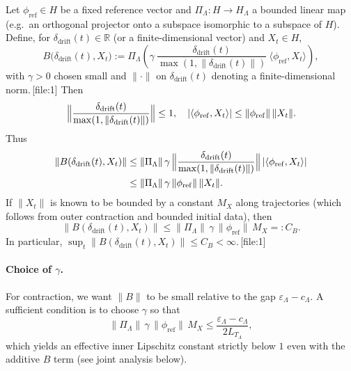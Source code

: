 \documentclass[11pt]{article}
\begin{document}
Let $\phi_{\mathrm{ref}}\in H$ be a fixed reference vector and $\Pi_\Lambda:H\to H_\Lambda$ a bounded linear map (e.g.\ an orthogonal projector onto a subspace isomorphic to a subspace of $H$). Define, for $\delta_{\mathrm{drift}}(t)\in\mathbb{R}$ (or a finite-dimensional vector) and $X_t\in H$,
\begin{equation}
B\bigl(\delta_{\mathrm{drift}}(t), X_t\bigr) 
:= \Pi_\Lambda\left(\gamma\ \frac{\delta_{\mathrm{drift}}(t)}{\max(1,\|\delta_{\mathrm{drift}}(t)\|)}\ \langle\phi_{\mathrm{ref}},X_t\rangle\right),
\label{eq:A-B-definition}
\end{equation}
with $\gamma>0$ chosen small and $\|\cdot\|$ on $\delta_{\mathrm{drift}}(t)$ denoting a finite-dimensional norm.\,[file:1] Then
\[
\Bigl\|\frac{\delta_{\mathrm{drift}}(t)}{\max(1,\|\delta_{\mathrm{drift}}(t)\|)}\Bigr\|\le 1,
\quad
|\langle\phi_{\mathrm{ref}},X_t\rangle|\le \|\phi_{\mathrm{ref}}\|\,\|X_t\|.
\]
Thus
\begin{align*}
\|B(\delta_{\mathrm{drift}}(t),X_t)\|
&\le \|\Pi_\Lambda\|\, \gamma\, 
   \Bigl\|\frac{\delta_{\mathrm{drift}}(t)}{\max(1,\|\delta_{\mathrm{drift}}(t)\|)}\Bigr\|\,
   |\langle\phi_{\mathrm{ref}},X_t\rangle|\\
&\le \|\Pi_\Lambda\|\,\gamma\,\|\phi_{\mathrm{ref}}\|\,\|X_t\|.
\end{align*}
If $\|X_t\|$ is known to be bounded by a constant $M_X$ along trajectories (which follows from outer contraction and bounded initial data), then
\begin{equation}
\|B(\delta_{\mathrm{drift}}(t),X_t)\|
\le \|\Pi_\Lambda\|\,\gamma\,\|\phi_{\mathrm{ref}}\|\,M_X
=: C_B.
\label{eq:A-B-bound}
\end{equation}
In particular, $\sup_t \|B(\delta_{\mathrm{drift}}(t),X_t)\|\le C_B<\infty$.\,[file:1]

\paragraph{Choice of $\gamma$.}
For contraction, we want $\|B\|$ to be small relative to the gap $\varepsilon_\Lambda - c_\Lambda$. A sufficient condition is to choose $\gamma$ so that
\begin{equation}
\|\Pi_\Lambda\|\,\gamma\,\|\phi_{\mathrm{ref}}\|\,M_X 
\le \frac{\varepsilon_\Lambda - c_\Lambda}{2L_{T_\Lambda}},
\label{eq:A-gamma-choice}
\end{equation}
which yields an effective inner Lipschitz constant strictly below $1$ even with the additive $B$ term (see joint analysis below).
\end{document}
